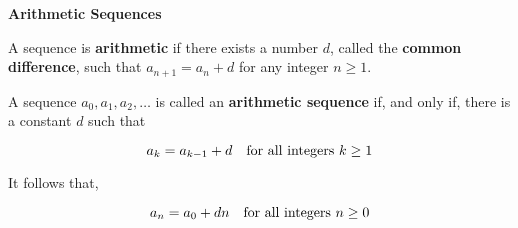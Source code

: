 {\bf Arithmetic Sequences}
\vskip 6pt

A sequence is {\bf arithmetic} if there exists a number $d$, called the {\bf common difference}, such that 
\vskip 0.5mm
$a_{n+1}=a_n+d$ for any integer $n\geq 1$.

\vskip 2cm
A sequence $a_0,a_1,a_2,\ldots$ is called an {\bf arithmetic sequence} if, and only if, there is a constant $d$ such that

$$a_k=a_{k-1}+d \quad\hbox{for all integers $k\geq 1$}$$

\vskip 1mm
It follows that,

$$a_n=a_0+dn \quad\hbox{for all integers $n\geq 0$}$$

\vfill\eject

